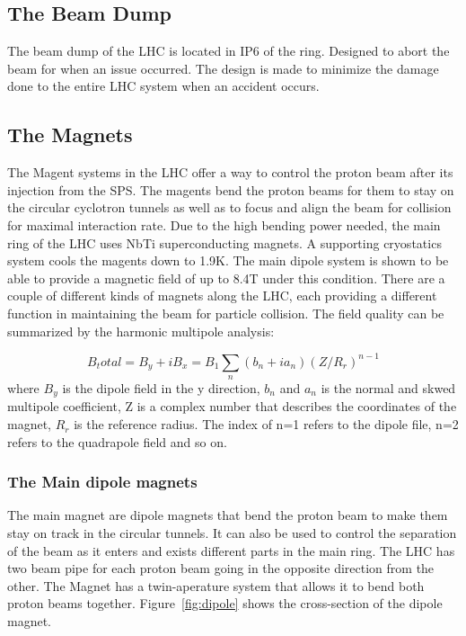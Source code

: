 \subsection*{The Beam Dump}
The beam dump of the LHC is located in IP6 of the ring. Designed to abort the beam for when an issue occurred. The design is made to minimize the damage done to the entire LHC system when an accident occurs. 

\subsection*{The Magnets}
The Magent systems in the LHC offer a way to control the proton beam after its injection from the SPS. The magents bend the proton beams for them to stay on the circular cyclotron tunnels as well as to focus and align the beam for collision for maximal interaction rate. Due to the high bending power needed, the main ring of the LHC uses NbTi superconducting magnets.  A supporting cryostatics system cools the magents down to 1.9K. The main dipole system is shown to be able to provide a magnetic field of up to 8.4T under this condition. There are a couple of different kinds of magnets along the
LHC, each providing a different function in maintaining the beam for particle collision. The field quality can be summarized by the harmonic multipole analysis: 

\[ B_total = B_y+ iB_x  = B_1\sum_n(b_{n} + i a_{n})(Z/R_{r})^{n-1}\]
where $B_y$ is the dipole field in the y direction, $b_{n}$ and $a_n$ is the normal and skwed multipole coefficient, Z is a complex number that describes the coordinates of the magnet, $R_{r}$ is the reference radius. The index of n=1 refers to the dipole file, n=2  refers to the quadrapole field and so on. 


\subsubsection*{The Main dipole magnets}
The main magnet are dipole magnets that bend the proton beam to make them stay on track in the circular tunnels. It can also be used to control the separation of the beam as it enters and exists different parts in the main ring. 
The LHC has two beam pipe for each proton beam going in the opposite direction from the other. The Magnet has a twin-aperature system that allows it to bend both proton beams together. Figure~\ref{fig:dipole} shows the cross-section of the dipole magnet. 



